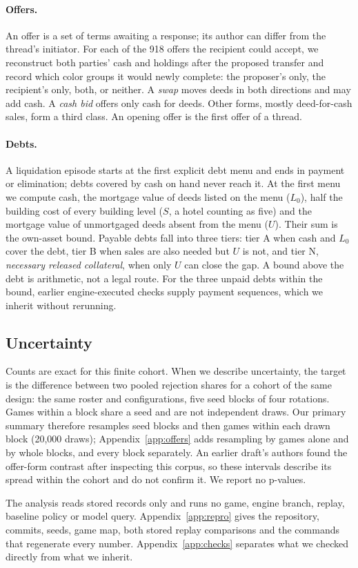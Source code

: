 \paragraph{Offers.} An offer is a set of terms awaiting a response; its author can differ from the thread's initiator. For each of the 918 offers the recipient could accept, we reconstruct both parties' cash and holdings after the proposed transfer and record which color groups it would newly complete: the proposer's only, the recipient's only, both, or neither. A \emph{swap} moves deeds in both directions and may add cash. A \emph{cash bid} offers only cash for deeds. Other forms, mostly deed-for-cash sales, form a third class. An opening offer is the first offer of a thread.

\paragraph{Debts.} A liquidation episode starts at the first explicit debt menu and ends in payment or elimination; debts covered by cash on hand never reach it. At the first menu we compute cash, the mortgage value of deeds listed on the menu ($L_0$), half the building cost of every building level ($S$, a hotel counting as five) and the mortgage value of unmortgaged deeds absent from the menu ($U$). Their sum is the own-asset bound. Payable debts fall into three tiers: tier A when cash and $L_0$ cover the debt, tier B when sales are also needed but $U$ is not, and tier N, \emph{necessary released collateral}, when only $U$ can close the gap. A bound above the debt is arithmetic, not a legal route. For the three unpaid debts within the bound, earlier engine-executed checks supply payment sequences, which we inherit without rerunning.

\subsection{Uncertainty}
Counts are exact for this finite cohort. When we describe uncertainty, the target is the difference between two pooled rejection shares for a cohort of the same design: the same roster and configurations, five seed blocks of four rotations. Games within a block share a seed and are not independent draws. Our primary summary therefore resamples seed blocks and then games within each drawn block (20,000 draws); Appendix~\ref{app:offers} adds resampling by games alone and by whole blocks, and every block separately. An earlier draft's authors found the offer-form contrast after inspecting this corpus, so these intervals describe its spread within the cohort and do not confirm it. We report no p-values.

The analysis reads stored records only and runs no game, engine branch, replay, baseline policy or model query. Appendix~\ref{app:repro} gives the repository, commits, seeds, game map, both stored replay comparisons and the commands that regenerate every number. Appendix~\ref{app:checks} separates what we checked directly from what we inherit.
